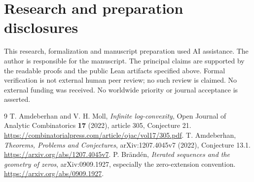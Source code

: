 \documentclass[11pt]{article}
\begin{document}
\section*{Research and preparation disclosures}
This research, formalization and manuscript preparation used AI assistance.
The author is responsible for the manuscript. The principal claims are
supported by the readable proofs and the public Lean artifacts specified
above. Formal verification is not external human peer review; no such review
is claimed. No external funding was received. No worldwide priority or
journal acceptance is asserted.
\begin{thebibliography}{9}
 T. Amdeberhan and V. H. Moll, \emph{Infinite log-convexity}, Open Journal of Analytic Combinatorics \textbf{17} (2022), article 305, Conjecture 21. \url{https://combinatorialpress.com/article/ojac/vol17/305.pdf}.
 T. Amdeberhan, \emph{Theorems, Problems and Conjectures}, arXiv:1207.4045v7 (2022), Conjecture 13.1. \url{https://arxiv.org/abs/1207.4045v7}.
 P. Br\"and\'en, \emph{Iterated sequences and the geometry of zeros}, arXiv:0909.1927, especially the zero-extension convention. \url{https://arxiv.org/abs/0909.1927}.
\end{thebibliography}
\end{document}
